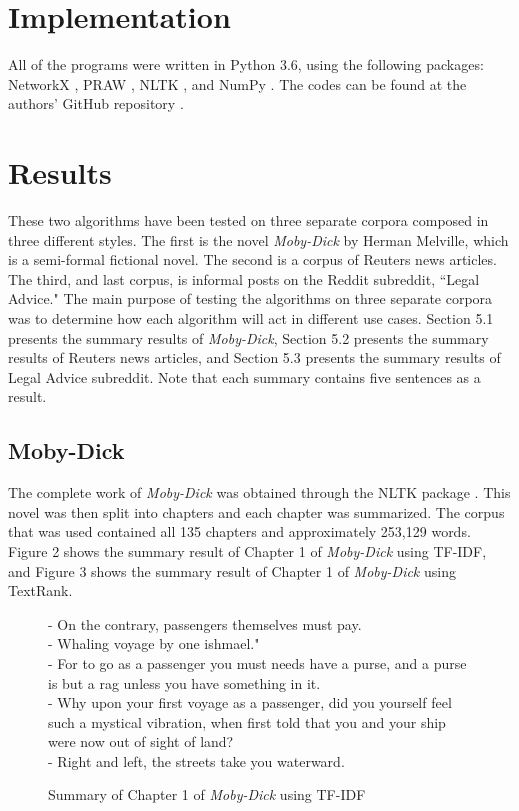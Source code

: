 \documentclass{article}[10]
\begin{document}
\section{Implementation}
All of the programs were written in Python 3.6, using the following packages: NetworkX \cite{networkX}, PRAW \cite{PRAW}, NLTK \cite{hermann2015teaching}, and NumPy \cite{numpy}. The codes can be found at the authors' GitHub repository \cite{DayAutomaticAnon}.

\section{Results}
These two algorithms have been tested on three separate corpora composed in three different styles. The first is the novel \textit{Moby-Dick} by Herman Melville, which is a semi-formal fictional novel. The second is a corpus of Reuters news articles. The third, and last corpus, is informal posts on the Reddit subreddit, ``Legal Advice." The main purpose of testing the algorithms on three separate corpora was to determine how each algorithm will act in different use cases. Section 5.1 presents the summary results of \textit{Moby-Dick}, Section 5.2 presents the summary results of Reuters news articles, and Section 5.3 presents the summary results of Legal Advice subreddit. Note that each summary contains five sentences as a result.

\subsection{Moby-Dick}
The complete work of \textit{Moby-Dick} was obtained through the NLTK package \cite{bird2009natural}. This novel was then split into chapters and each chapter was summarized. The corpus that was used contained all 135 chapters and approximately 253,129 words. Figure 2 shows the summary result of Chapter 1 of \textit{Moby-Dick} using TF-IDF, and Figure 3 shows the summary result of Chapter 1 of \textit{Moby-Dick} using TextRank.

\begin{figure}
    \begin{framed}
        - On the contrary, passengers themselves must pay.\\
        - Whaling voyage by one ishmael."\\
        - For to go as a passenger you must needs have a purse, and a purse is but a rag unless you have something in it.\\
        - Why upon your first voyage as a passenger, did you yourself feel such a mystical vibration, when first told that you and your ship were now out of sight of land?\\
        - Right and left, the streets take you waterward.\\
        \caption{Summary of Chapter 1 of \textit{Moby-Dick} using TF-IDF}
        \label{results-tfidf-moby}
    \end{framed}
\end{figure}
\end{document}
